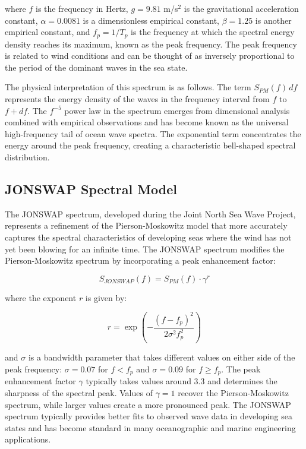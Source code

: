 ﻿\documentclass[a4paper,11pt]{article}
\theoremstyle{definition}
\begin{document}
where $f$ is the frequency in Hertz, $g = 9.81$ m/s$^2$ is the gravitational acceleration constant, $\alpha = 0.0081$ is a dimensionless empirical constant, $\beta = 1.25$ is another empirical constant, and $f_p = 1/T_p$ is the frequency at which the spectral energy density reaches its maximum, known as the peak frequency. The peak frequency is related to wind conditions and can be thought of as inversely proportional to the period of the dominant waves in the sea state.

The physical interpretation of this spectrum is as follows. The term $S_{PM}(f) \, df$ represents the energy density of the waves in the frequency interval from $f$ to $f + df$. The $f^{-5}$ power law in the spectrum emerges from dimensional analysis combined with empirical observations and has become known as the universal high-frequency tail of ocean wave spectra. The exponential term concentrates the energy around the peak frequency, creating a characteristic bell-shaped spectral distribution.

\subsection{JONSWAP Spectral Model}

The JONSWAP spectrum, developed during the Joint North Sea Wave Project, represents a refinement of the Pierson-Moskowitz model that more accurately captures the spectral characteristics of developing seas where the wind has not yet been blowing for an infinite time. The JONSWAP spectrum modifies the Pierson-Moskowitz spectrum by incorporating a peak enhancement factor:

\begin{equation}
S_{JONSWAP}(f) = S_{PM}(f) \cdot \gamma^r
\label{eq:jonswap}
\end{equation}

where the exponent $r$ is given by:

\begin{equation}
r = \exp\left( -\frac{(f - f_p)^2}{2\sigma^2 f_p^2} \right)
\end{equation}

and $\sigma$ is a bandwidth parameter that takes different values on either side of the peak frequency: $\sigma = 0.07$ for $f < f_p$ and $\sigma = 0.09$ for $f \geq f_p$. The peak enhancement factor $\gamma$ typically takes values around 3.3 and determines the sharpness of the spectral peak. Values of $\gamma = 1$ recover the Pierson-Moskowitz spectrum, while larger values create a more pronounced peak. The JONSWAP spectrum typically provides better fits to observed wave data in developing sea states and has become standard in many oceanographic and marine engineering applications.
\end{document}
